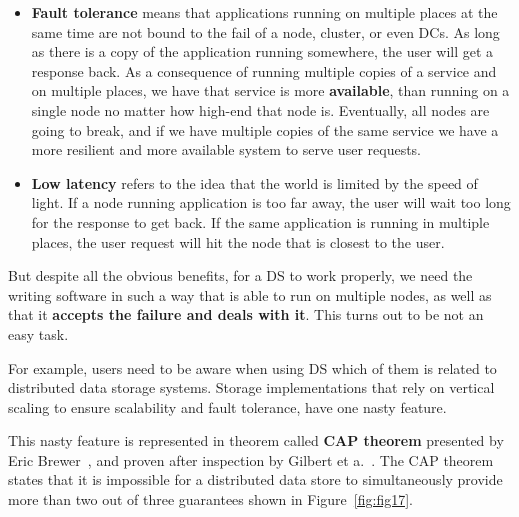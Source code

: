 \begin{itemize}
	\item \textbf{Fault tolerance} means that applications running on multiple places at the same time are not bound to the fail of a node, cluster, or even DCs. As long as there is a copy of the application running somewhere, the user will get a response back. As a consequence of running multiple copies of a service and on multiple places, we have that service is more \textbf{available}, than running on a single node no matter how high-end that node is. Eventually, all nodes are going to break, and if we have multiple copies of the same service we have a more resilient and more available system to serve user requests.
	\item \textbf{Low latency} refers to the idea that the world is limited by the speed of light. If a node running application is too far away, the user will wait too long for the response to get back. If the same application is running in multiple places, the user request will hit the node that is closest to the user.
\end{itemize}

\noindent
But despite all the obvious benefits, for a DS to work properly, we need the writing software in such a way that is able to run on multiple nodes, as well as that it \textbf{accepts the failure and deals with it}. This turns out to be not an easy task.

For example, users need to be aware when using DS which of them is related to distributed data storage systems. Storage implementations that rely on vertical scaling to ensure scalability and fault tolerance, have one nasty feature. 

This nasty feature is represented in theorem called \textbf{CAP theorem} presented by Eric Brewer~\cite{Brewer2000}, and proven after inspection by Gilbert et a.~\cite{GilbertL02}. The CAP theorem states that it is impossible for a distributed data store to simultaneously provide more than two out of three guarantees shown in Figure~\ref{fig:fig17}.

